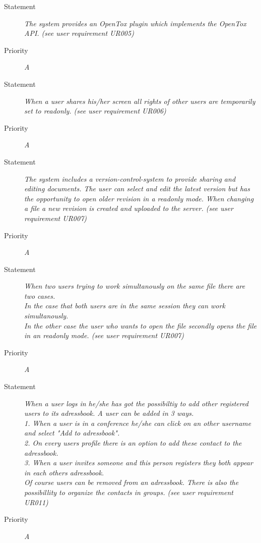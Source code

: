 \FR
\begin{description}
  \item[Statement]
    \textit{The system provides an OpenTox plugin which implements the OpenTox \gls{API}. (see user requirement UR005)}
  \item[Priority]
    \textit{A}
\end{description}


\FR
\begin{description}
  \item[Statement]
    \textit{When a user shares his/her screen all rights of other users are temporarily set to readonly. (see user requirement UR006)}
  \item[Priority]
    \textit{A}
\end{description}


\FR
\begin{description}
  \item[Statement]
    \textit{The system includes a version-control-system to provide sharing and editing documents. The user can select and edit the latest version but has the opportunity to open older revision in a readonly mode. When changing a file a new revision is created and uploaded to the server. (see user requirement UR007)}
  \item[Priority]
    \textit{A}
\end{description}

\FR
\begin{description}
  \item[Statement]
    \textit{When two users trying to work simultanously on the same file there are two cases. \\In the case that both users are in the same session they can work simultanously. \\In the other case the user who wants to open the file secondly opens the file in an readonly mode. (see user requirement UR007)}
  \item[Priority]
    \textit{A}
\end{description}

\FR
\begin{description}
  \item[Statement]
    \textit{When a user logs in he/she has got the possibiltiy to add
      other registered users to its adressbook. A user can be added in
      3 ways.\\1. When a user is in a conference he/she can click on
      an other username and select "Add to adressbook".\\2. On every
      users profile there is an option to add these contact to the
      adressbook.\\3. When a user invites someone and this person registers they both appear in each others adressbook.\\Of course users can be removed from an adressbook. There is also the possibillity to organize the contacts in groups. (see user requirement UR011)}
  \item[Priority]
    \textit{A}
\end{description}

